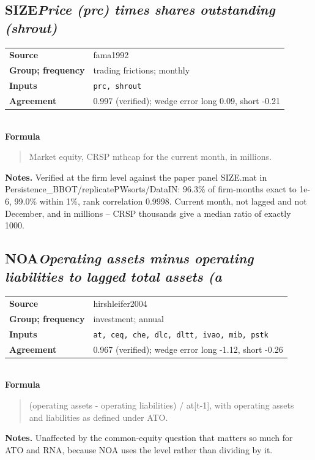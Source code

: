 \documentclass[11pt]{article}
\begin{document}
\subsection*{SIZE\quad\normalfont\itshape Price (prc) times shares outstanding (shrout)}
\begin{tabular}{@{}p{3.3cm}p{12.3cm}@{}}
\textbf{Source} & fama1992\\
\textbf{Group; frequency} & trading frictions; monthly\\
\textbf{Inputs} & \texttt{prc, shrout}\\
\textbf{Agreement} & 0.997 (verified); wedge error long 0.09, short -0.21\\
\end{tabular}\\[4pt]
\textbf{Formula}
\begin{quote}\small
Market equity, CRSP mthcap for the current month, in millions.\\

\end{quote}
\textbf{Notes.} Verified at the firm level against the paper panel SIZE.mat in Persistence\_BBOT/replicatePWsorts/DataIN: 96.3\% of firm-months exact to 1e-6, 99.0\% within 1\%, rank correlation 0.9998. Current month, not lagged and not December, and in millions -- CRSP thousands give a median ratio of exactly 1000.


\subsection*{NOA\quad\normalfont\itshape Operating assets minus operating liabilities to lagged total assets (a}
\begin{tabular}{@{}p{3.3cm}p{12.3cm}@{}}
\textbf{Source} & hirshleifer2004\\
\textbf{Group; frequency} & investment; annual\\
\textbf{Inputs} & \texttt{at, ceq, che, dlc, dltt, ivao, mib, pstk}\\
\textbf{Agreement} & 0.967 (verified); wedge error long -1.12, short -0.26\\
\end{tabular}\\[4pt]
\textbf{Formula}
\begin{quote}\small
(operating assets - operating liabilities) / at[t-1], with operating assets\\
and liabilities as defined under ATO.\\

\end{quote}
\textbf{Notes.} Unaffected by the common-equity question that matters so much for ATO and RNA,
because NOA uses the level rather than dividing by it.
\end{document}
